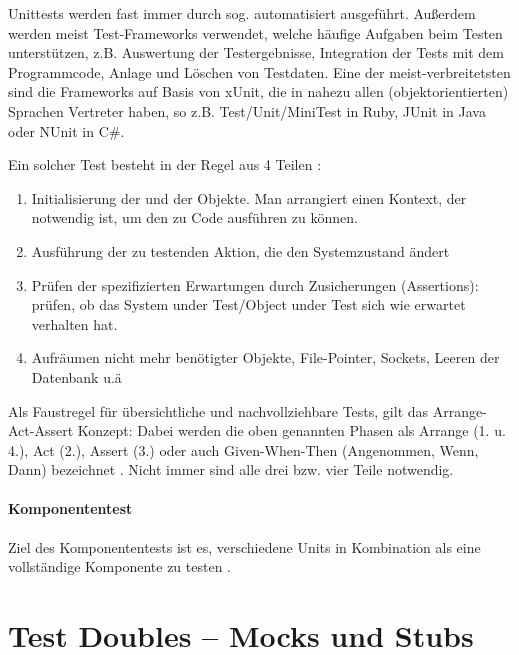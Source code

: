 Unittests werden fast immer durch sog.  automatisiert ausgeführt. Außerdem werden meist Test-Frameworks verwendet, welche häufige Aufgaben beim Testen unterstützen, z.B. Auswertung der Testergebnisse, Integration der Tests mit dem Programmcode, Anlage und Löschen von Testdaten.  Eine der meist-verbreitetsten sind die Frameworks auf Basis von xUnit, die in nahezu allen (objektorientierten) Sprachen Vertreter haben, so z.B. Test/Unit/MiniTest in Ruby, JUnit in Java oder NUnit in C\#.

Ein solcher Test besteht in der Regel aus 4 Teilen \citep{rappin_rails_2011} \citep[Karte 46]{langr_agile_2011}:
\begin{enumerate}
 \item Initialisierung der  und der Objekte. Man arrangiert einen Kontext, der notwendig ist, um den zu Code ausführen zu können.
 \item Ausführung der zu testenden Aktion, die den Systemzustand ändert
 \item Prüfen der spezifizierten Erwartungen durch Zusicherungen (Assertions): prüfen, ob das System under Test/Object under Test sich wie erwartet verhalten hat.
 \item Aufräumen nicht mehr benötigter Objekte, File-Pointer, Sockets, Leeren der Datenbank u.ä
\end{enumerate}
Als Faustregel für übersichtliche und nachvollziehbare Tests, gilt das Arrange-Act-Assert Konzept: Dabei werden die oben genannten Phasen als Arrange (1. u. 4.), Act (2.), Assert (3.) oder auch Given-When-Then (Angenommen, Wenn, Dann) bezeichnet \citep[Karte 46]{langr_agile_2011}. Nicht immer sind alle drei bzw. vier Teile notwendig.

\paragraph{Komponententest}
Ziel des Komponententests ist es, verschiedene Units in Kombination als eine vollständige Komponente zu testen \citep{goodliffe_code_2006}.

 \section{Test Doubles -- Mocks und Stubs}
  \label{sec:mocks}


